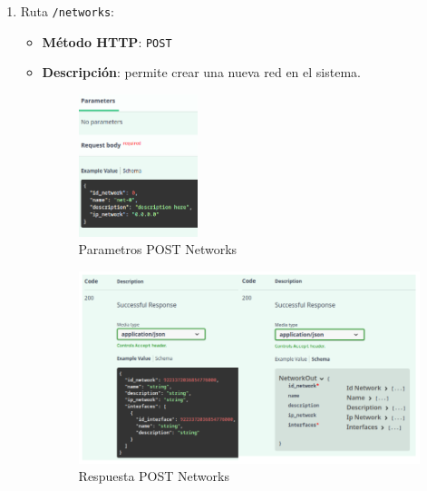 \documentclass[a4paper, oneside, 12pt]{book}
\begin{document}
\begin{enumerate}
		\item Ruta \texttt{/networks}:
		
		\begin{itemize}
			\item \textbf{Método HTTP}: \texttt{POST}
			\item \textbf{Descripción}: permite crear una nueva red en el sistema.
			
			\begin{figure}[h!]
				\begin{center}
					\includegraphics[width=0.35\textwidth]{img/parameters_post_networks.png}
					\caption{Parametros POST Networks}
					\label{img: parameters post networks}
				\end{center}
			\end{figure}
			
			\begin{figure}[h!]
				\begin{center}
					\includegraphics[width=1\textwidth]{diag/response_post_networks.png}
					\caption{Respuesta POST Networks}
					\label{img: response post networks}
				\end{center}
			\end{figure}
		\end{itemize}
	

\end{enumerate}
\end{document}
